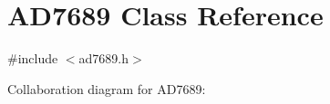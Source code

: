 \hypertarget{class_a_d7689}{}\section{A\+D7689 Class Reference}
\label{class_a_d7689}


{\ttfamily \#include $<$ad7689.\+h$>$}



Collaboration diagram for A\+D7689\+:
